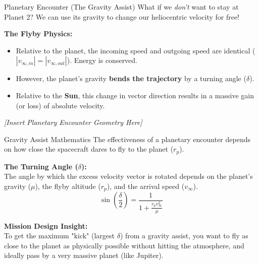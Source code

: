 \documentclass[11pt]{beamer}
\begin{document}
\begin{frame}{Planetary Encounter (The Gravity Assist)}
    What if we \textit{don't} want to stay at Planet 2? We can use its gravity to change our heliocentric velocity for free!
    
    \vspace{0.2cm}
    \textbf{The Flyby Physics:}
    \begin{itemize}
        \item Relative to the planet, the incoming speed and outgoing speed are identical ($|v_{\infty, in}| = |v_{\infty, out}|$). Energy is conserved.
        \item However, the planet's gravity \textbf{bends the trajectory} by a turning angle ($\delta$).
        \item Relative to the \textbf{Sun}, this change in vector direction results in a massive gain (or loss) of absolute velocity.
    \end{itemize}

    \begin{center}
        \textit{[Insert Planetary Encounter Geometry Here]}
    \end{center}
\end{frame}

\begin{frame}{Gravity Assist Mathematics}
    The effectiveness of a planetary encounter depends on how close the spacecraft dares to fly to the planet ($r_p$).
    
    \vspace{0.3cm}
    \textbf{The Turning Angle ($\delta$):} \\
    The angle by which the excess velocity vector is rotated depends on the planet's gravity ($\mu$), the flyby altitude ($r_p$), and the arrival speed ($v_\infty$).
    \begin{equation}
        \sin \left( \frac{\delta}{2} \right) = \frac{1}{1 + \frac{r_p v_\infty^2}{\mu}}
    \end{equation}

    \vspace{0.3cm}
    \textbf{Mission Design Insight:} \\
    To get the maximum "kick" (largest $\delta$) from a gravity assist, you want to fly as close to the planet as physically possible without hitting the atmosphere, and ideally pass by a very massive planet (like Jupiter).
\end{frame}
\end{document}
